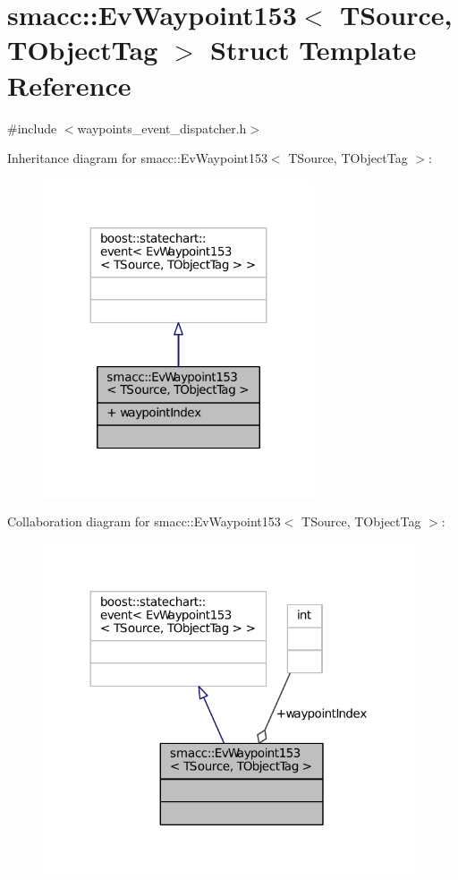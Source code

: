 \hypertarget{structsmacc_1_1EvWaypoint153}{}\section{smacc\+:\+:Ev\+Waypoint153$<$ T\+Source, T\+Object\+Tag $>$ Struct Template Reference}
\label{structsmacc_1_1EvWaypoint153}


{\ttfamily \#include $<$waypoints\+\_\+event\+\_\+dispatcher.\+h$>$}



Inheritance diagram for smacc\+:\+:Ev\+Waypoint153$<$ T\+Source, T\+Object\+Tag $>$\+:
\nopagebreak
\begin{figure}[H]
\begin{center}
\leavevmode
\includegraphics[width=227pt]{structsmacc_1_1EvWaypoint153__inherit__graph}
\end{center}
\end{figure}


Collaboration diagram for smacc\+:\+:Ev\+Waypoint153$<$ T\+Source, T\+Object\+Tag $>$\+:
\nopagebreak
\begin{figure}[H]
\begin{center}
\leavevmode
\includegraphics[width=312pt]{structsmacc_1_1EvWaypoint153__coll__graph}
\end{center}
\end{figure}
